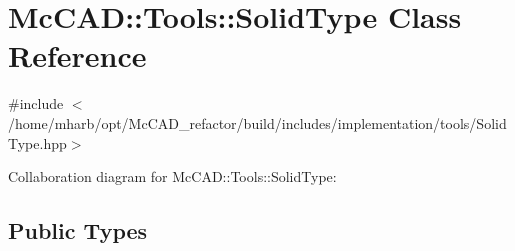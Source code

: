 \hypertarget{classMcCAD_1_1Tools_1_1SolidType}{}\section{Mc\+C\+AD\+:\+:Tools\+:\+:Solid\+Type Class Reference}
\label{classMcCAD_1_1Tools_1_1SolidType}


{\ttfamily \#include $<$/home/mharb/opt/\+Mc\+C\+A\+D\+\_\+refactor/build/includes/implementation/tools/\+Solid\+Type.\+hpp$>$}



Collaboration diagram for Mc\+C\+AD\+:\+:Tools\+:\+:Solid\+Type\+:
\subsection*{Public Types}

